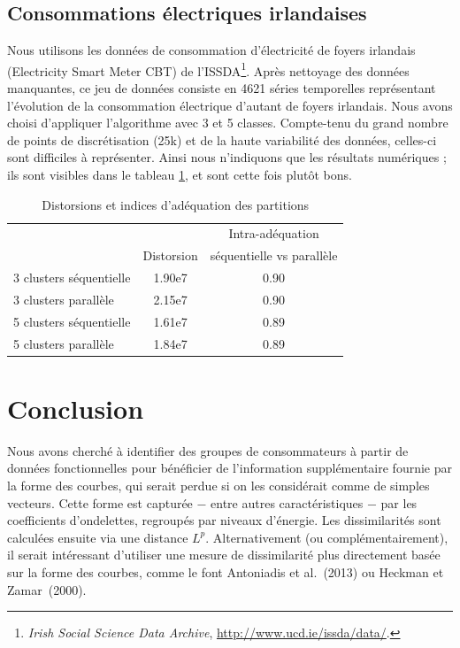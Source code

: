 \documentclass[12pt]{article}
\begin{document}
\subsection{Consommations électriques irlandaises}

Nous utilisons les données de consommation d'électricité de foyers irlandais (Electricity Smart Meter CBT) de l'ISSDA\footnote{\textit{Irish Social Science Data Archive}, \url{http://www.ucd.ie/issda/data/}.}. Après nettoyage des données manquantes, ce jeu de données consiste en 4621 séries temporelles représentant l'évolution de la consommation électrique d'autant de foyers irlandais. 
Nous avons choisi d'appliquer l'algorithme avec 3 et 5 classes. Compte-tenu du grand nombre de points de discrétisation (25k) 
et de la haute variabilité des données, celles-ci sont difficiles à représenter. Ainsi nous n'indiquons que les résultats numériques ; 
ils sont visibles dans le tableau \ref{tabDistorIr}, et sont cette fois plutôt bons.\\

\begin{table}[H]
\centering
\begin{tabular}{lcc} \toprule
 &            & Intra-adéquation \\
 & Distorsion &  séquentielle vs parallèle \\ 
\midrule %
3 clusters séquentielle & 1.90e7 & 0.90\\
3 clusters parallèle & 2.15e7 & 0.90\\
5 clusters séquentielle & 1.61e7 & 0.89\\
5 clusters parallèle & 1.84e7 & 0.89\\
\bottomrule %
\end{tabular}
\caption{Distorsions et indices d'adéquation des partitions}
\label{tabDistorIr}
\end{table}

\section{Conclusion}

Nous avons cherché à identifier des groupes de consommateurs à partir de données fonctionnelles 
pour bénéficier de l'information supplémentaire fournie par la forme des courbes, qui serait perdue 
si on les considérait comme de simples vecteurs. Cette forme est capturée $-$ entre autres caractéristiques $-$ 
par les coefficients d'ondelettes, regroupés par niveaux d'énergie. Les dissimilarités sont calculées ensuite 
via une distance $L^p$. Alternativement (ou complémentairement), il serait intéressant d'utiliser une mesure de dissimilarité 
plus directement basée sur la forme des courbes, comme le font Antoniadis et al.~(2013) ou Heckman et Zamar~(2000).
\end{document}
